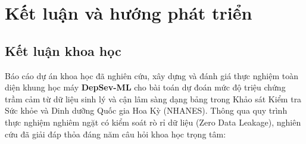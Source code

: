 \chapter{Kết luận và hướng phát triển}
\label{ch:ket-luan}

\section{Kết luận khoa học}
\label{sec:ket-luan-khoa-hoc}

Báo cáo dự án khoa học đã nghiên cứu, xây dựng và đánh giá thực nghiệm toàn diện khung học máy \textbf{DepSev-ML} cho bài toán dự đoán mức độ triệu chứng trầm cảm từ dữ liệu sinh lý và cận lâm sàng dạng bảng trong Khảo sát Kiểm tra Sức khỏe và Dinh dưỡng Quốc gia Hoa Kỳ (NHANES). Thông qua quy trình thực nghiệm nghiêm ngặt có kiểm soát rò rỉ dữ liệu (Zero Data Leakage), nghiên cứu đã giải đáp thỏa đáng năm câu hỏi khoa học trọng tâm:

